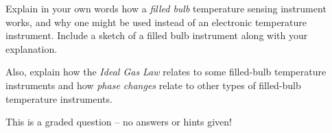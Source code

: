 

Explain in your own words how a {\it filled bulb} temperature sensing instrument works, and why one might be used instead of an electronic temperature instrument.  Include a sketch of a filled bulb instrument along with your explanation.

\vskip 10pt

Also, explain how the {\it Ideal Gas Law} relates to some filled-bulb temperature instruments and how {\it phase changes} relate to other types of filled-bulb temperature instruments.

\vfil

\eject






This is a graded question -- no answers or hints given!











